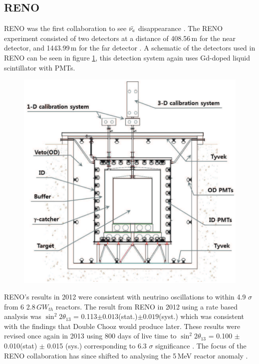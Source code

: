 \subsection{RENO}
RENO was the first collaboration to see $\Bar{\nu_e}$ disappearance \cite{Olive_2014}. The RENO experiment consisted of two detectors at a distance of 408.56\,m for the near detector, and 1443.99\,m for the far detector \cite{reno_may_2012}. A schematic of the detectors used in RENO can be seen in figure \ref{RENO_detector}, this detection system again uses Gd-doped liquid scintillator with PMTs. 

\begin{figure}[!h]
 \centering
 \includegraphics[width=0.5\linewidth]{Chapter2/Figs/Raster/RENO_detector.png} %

 \label{RENO_detector}
\end{figure}

RENO's results in 2012 were consistent with neutrino oscillations to within 4.9 $\sigma$ from 6 2.8\,$GW_{th}$ reactors. The result from RENO in 2012 using a rate based analysis was $\sin^2{2\theta_{13}}$ = 0.113$\pm0.013$(stat.)$\pm0.019$(syst.) which was consistent with the findings that Double Chooz would produce later. These results were revised once again in 2013 using 800 days of live time to $\sin^2{2\theta_{13}}$ = 0.100 $\pm$ 0.010(stat) $\pm$ 0.015 (sys.) corresponding to 6.3 $\sigma$ significance \cite{reno2013}. The focus of the RENO collaboration has since shifted to analysing the 5\,MeV reactor anomaly \cite{reno_may_2019}.  

